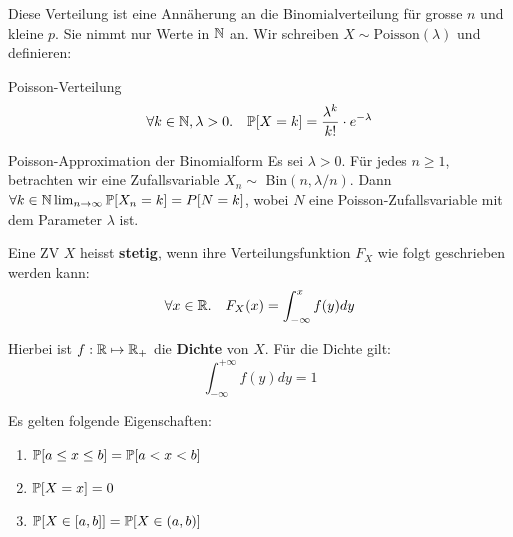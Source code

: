  Diese Verteilung ist eine Annäherung an die Binomialverteilung für grosse $n$ und kleine $p$. Sie nimmt nur Werte in $\mathbb{N}$ an. Wir schreiben $X \sim \text{Poisson}(\lambda)$ und definieren:

\begin{mainbox}{Poisson-Verteilung}
    $$\forall k \in \mathbb{N}, \lambda > 0. \quad \mathbb{P}[X = k] = \frac{\lambda^k}{k!}\cdot e^{-\lambda}$$
\end{mainbox}

\begin{subbox}{Poisson-Approximation der Binomialform}
    Es sei $\lambda > 0$. Für jedes $n \geq 1$,
    betrachten wir eine Zufallsvariable $X_n \sim$ Bin$(n, \lambda / n)$. Dann
    $\forall k \in \mathbb{N} \lim_{n \rightarrow \infty} \mathbb{P}[X_n = k] = P[N = k]$,
    wobei $N$ eine Poisson-Zufallsvariable mit dem Parameter $\lambda$ ist.
\end{subbox}


\begin{mainbox}{}
    Eine ZV $X$ heisst \textbf{stetig}, wenn ihre Verteilungsfunktion $F_X$ wie folgt geschrieben werden kann:
    $$\forall x \in \mathbb{R}. \quad F_X(x) = \int_{-\infty}^x f(y)dy$$
\end{mainbox}

Hierbei ist $f: \mathbb{R} \mapsto \mathbb{R}_+$ die \textbf{Dichte} von $X$. Für die Dichte gilt:
$$\int_{-\infty}^{+\infty} f(y)dy = 1$$

Es gelten folgende Eigenschaften: 
\begin{enumerate}
    \item $\mathbb{P} [a \leq x \leq b] = \mathbb{P} [a < x < b]$ 
    \item $\mathbb{P}[X = x] = 0$
    \item $\mathbb{P}[X \in [a, b ]] = \mathbb{P} [X \in (a,b)]$
\end{enumerate}



